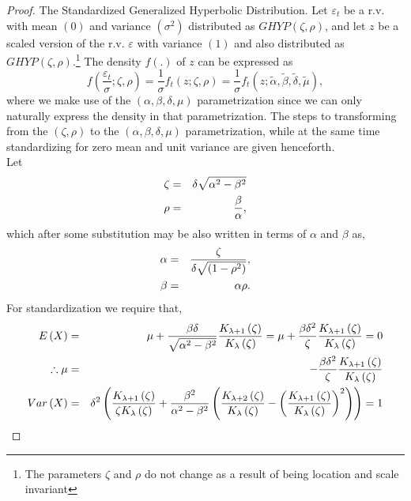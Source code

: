 \begin{proof}
The Standardized Generalized Hyperbolic Distribution. Let $\varepsilon_t$ be a
r.v. with mean $(0)$ and variance $({\sigma}^2)$ distributed as $GHYP(\zeta, \rho)$,
and let $z$ be a scaled version of the r.v. $\varepsilon$ with variance $(1)$
and also distributed as $GHYP(\zeta, \rho)$.\footnote{The parameters
$\zeta$ and $\rho$ do not change as a result of being location and scale
invariant} The density $f(.)$ of $z$ can be expressed as
\begin{equation}\label{sgh1}
f(\frac{\varepsilon_t}{\sigma}; \zeta ,\rho ) = \frac{1}{\sigma}f_t(z;\zeta ,\rho ) =
\frac{1}{\sigma}f_t(z;\tilde \alpha, \tilde \beta, \tilde \delta ,\tilde \mu ),
\end{equation}
where we make use of the $(\alpha, \beta, \delta, \mu)$ parametrization since we
can only naturally express the density in that parametrization. The steps to
transforming from the $(\zeta, \rho)$ to the $(\alpha, \beta, \delta, \mu)$
parametrization, while at the same time standardizing for zero mean and unit
variance are given henceforth.\\
Let
\begin{eqnarray}
\zeta & = & \delta \sqrt {{\alpha ^2} - {\beta ^2}} \hfill\label{sgh21} \\
\rho & = & \frac{\beta }{\alpha }, \hfill\label{sgh22}
\end{eqnarray}
which after some substitution may be also written in terms of  $\alpha$ and $\beta$ as,
\begin{eqnarray}
\alpha & = & \frac{\zeta }{{\delta \sqrt {(1 - {\rho ^2})} }},\hfill\label{sgh31}\\
\beta  & = &\alpha \rho.\hfill\label{sgh32}
\end{eqnarray}
For standardization we require that,
\begin{eqnarray}
  E\left(X\right) & = & \mu  + \frac{{\beta \delta }}{{\sqrt {{\alpha ^2} - {\beta ^2}} }}\frac{{{K_{\lambda  + 1}}\left(\zeta \right)}}{{{K_\lambda }\left(\zeta \right)}} = \mu  + \frac{{\beta {\delta ^2}}}{\zeta }\frac{{{K_{\lambda  + 1}}\left(\zeta \right)}}{{{K_\lambda }\left(\zeta \right)}} = 0 \hfill\nonumber \\
  \therefore \mu  & = & - \frac{{\beta {\delta ^2}}}{\zeta }\frac{{{K_{\lambda  + 1}}\left(\zeta \right)}}{{{K_\lambda }\left(\zeta \right)}}\hfill\label{sgh41} \\
  Var\left(X\right) & = & {\delta ^2}\left(\frac{{{K_{\lambda  + 1}}\left(\zeta \right)}}{{\zeta {K_\lambda }\left(\zeta \right)}} + \frac{{{\beta ^2}}}{{{\alpha ^2} - {\beta ^2}}}\left(\frac{{{K_{\lambda  + 2}}\left(\zeta \right)}}{{{K_\lambda }\left(\zeta \right)}} - {\left(\frac{{{K_{\lambda  + 1}}\left(\zeta \right)}}{{{K_\lambda }\left(\zeta \right)}}\right)^2}\right)\right) = 1 \hfill\nonumber \\

\end{eqnarray}
\end{proof}
